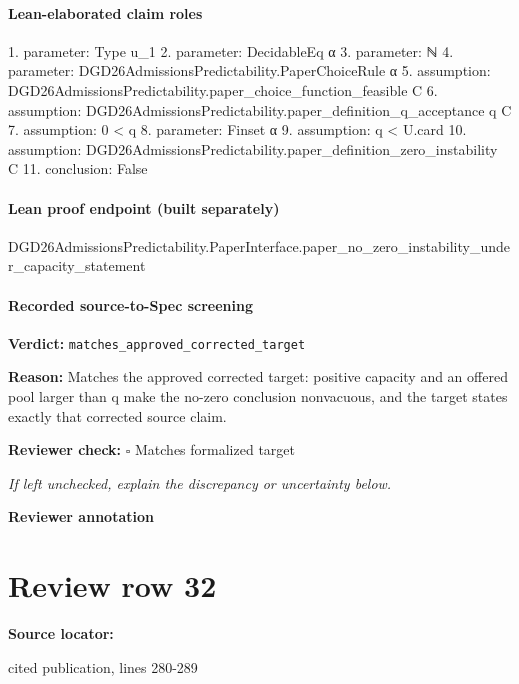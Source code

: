 \documentclass[10pt]{article}
\newcommand{\reviewerbox}{%
  \par\noindent\fbox{\parbox{0.96\linewidth}{\rule{0pt}{0.38in}}}\par
}
\newcommand{\reviewmatch}[1]{%
  \par\noindent\textbf{Reviewer check:} $\square$\; #1\par
  \noindent\emph{If left unchecked, explain the discrepancy or uncertainty below.}\par
}
\begin{document}
\paragraph{Lean-elaborated claim roles}\begin{ReviewVerbatim}
1. parameter: Type u_1
2. parameter: DecidableEq α
3. parameter: ℕ
4. parameter: DGD26AdmissionsPredictability.PaperChoiceRule α
5. assumption: DGD26AdmissionsPredictability.paper_choice_function_feasible C
6. assumption: DGD26AdmissionsPredictability.paper_definition_q_acceptance q C
7. assumption: 0 < q
8. parameter: Finset α
9. assumption: q < U.card
10. assumption: DGD26AdmissionsPredictability.paper_definition_zero_instability C
11. conclusion: False
\end{ReviewVerbatim}

\paragraph{Lean proof endpoint (built separately)}\begin{ReviewVerbatim}
DGD26AdmissionsPredictability.PaperInterface.paper_no_zero_instability_under_capacity_statement
\end{ReviewVerbatim}

\paragraph{Recorded source-to-Spec screening}
\textbf{Verdict:} \texttt{matches\_approved\_corrected\_target}
\\
{\raggedright
\textbf{Reason:} Matches the approved corrected target:\allowbreak{} positive capacity and an offered pool larger than q make the no-\allowbreak{}zero conclusion nonvacuous, and the target states exactly that corrected source claim.\allowbreak{}
\par}
\reviewmatch{Matches formalized target}
\noindent\textbf{Reviewer annotation}\par
\reviewerbox
\clearpage
\hypertarget{source-claim-4efb65f58e4bc480}{}
\section*{Review row 32}
\textbf{Source locator:} {\footnotesize\raggedright cited publication, lines 280-\allowbreak{}289\par}
\end{document}
